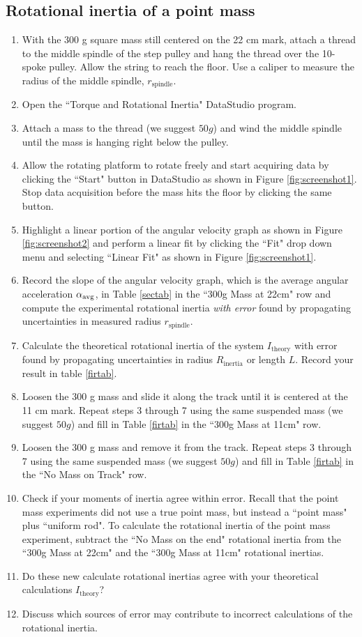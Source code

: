 \subsection{Rotational inertia of a point mass}
\label{pointmass}
\begin{enumerate}
	\item With the 300 g square mass still centered on the 22 cm mark, attach a thread to the middle spindle of the step pulley and hang the thread over the 10-spoke pulley.  Allow the string to reach the floor.  Use a caliper to measure the radius of the middle spindle, $r_\text{spindle}$.
	\item Open the ``Torque and Rotational Inertia" DataStudio program.
	\item Attach a mass to the thread (we suggest $50g$) and wind the middle spindle until the mass is hanging right below the pulley.
	\item Allow the rotating platform to rotate freely and start acquiring data by clicking the ``Start" button in DataStudio as shown in Figure \ref{fig:screenshot1}. Stop data acquisition before the mass hits the floor by clicking the same button.
	\item Highlight a linear portion of the angular velocity graph as shown in Figure \ref{fig:screenshot2} and perform a linear fit by clicking the ``Fit" drop down menu and selecting ``Linear Fit" as shown in Figure \ref{fig:screenshot1}.
	\item Record the slope of the angular velocity graph, which is the average angular acceleration $\alpha _{\rm avg}$, in Table \ref{sectab} in the ``300g Mass at 22cm" row and compute the experimental rotational inertia {\it{with error}} found by propagating uncertainties in measured radius $r_\text{spindle}$.
\item Calculate the theoretical rotational inertia of the system $I_\text{theory}$ with error found by propagating uncertainties in radius $R_\text{inertia}$ or length $L$. Record your result in table \ref{firtab}.
	\item Loosen the 300 g mass and slide it along the track until it is centered at the 11 cm mark.  Repeat steps 3 through 7 using the same suspended mass (we suggest $50g$) and fill in Table \ref{firtab} in the ``300g Mass at 11cm" row.
	\item Loosen the 300 g mass and remove it from the track.  Repeat steps 3 through 7 using the same suspended mass (we suggest $50g$) and fill in Table \ref{firtab} in the ``No Mass on Track" row.
\item Check if your moments of inertia agree within error. Recall that the point mass experiments did not use a true point mass, but instead a ``point mass" plus ``uniform rod". To calculate the rotational inertia of the point mass experiment, subtract the ``No Mass on the end" rotational inertia from the ``300g Mass at 22cm" and the ``300g Mass at 11cm" rotational inertias.
\item Do these new calculate rotational inertias agree with your theoretical calculations $I_\text{theory}$?
\item Discuss which sources of error may contribute to incorrect calculations of the rotational inertia.
\end{enumerate}

